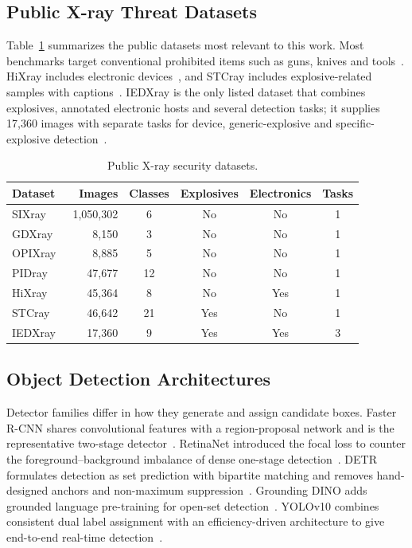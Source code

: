 \subsection{Public X-ray Threat Datasets}
Table~\ref{tab:datasets} summarizes the public datasets most relevant to this
work. Most benchmarks target conventional prohibited items such as guns, knives
and tools~\citep{miao2019sixray,mery2015gdxray,wei2020opixray,wang2021pidray}.
HiXray includes electronic devices~\citep{tao2021hixray}, and STCray includes
explosive-related samples with captions~\citep{velayudhan2025stingbee}. IEDXray is
the only listed dataset that combines explosives, annotated electronic hosts and
several detection tasks; it supplies 17,360 images with separate tasks for device,
generic-explosive and specific-explosive detection~\citep{takele2026iedxray}.

\begin{table}[htbp]
\centering\tablesetup
\caption{Public X-ray security datasets.}
\label{tab:datasets}
\begin{tabular}{@{}lrcccc@{}}
\toprule
Dataset & Images & Classes & Explosives & Electronics & Tasks\\
\midrule
SIXray~\citep{miao2019sixray} & 1,050,302 & 6 & No & No & 1\\
GDXray~\citep{mery2015gdxray} & 8,150 & 3 & No & No & 1\\
OPIXray~\citep{wei2020opixray} & 8,885 & 5 & No & No & 1\\
PIDray~\citep{wang2021pidray} & 47,677 & 12 & No & No & 1\\
HiXray~\citep{tao2021hixray} & 45,364 & 8 & No & Yes & 1\\
STCray~\citep{velayudhan2025stingbee} & 46,642 & 21 & Yes & No & 1\\
IEDXray~\citep{takele2026iedxray} & 17,360 & 9 & Yes & Yes & 3\\
\bottomrule
\end{tabular}
\end{table}

\subsection{Object Detection Architectures}
Detector families differ in how they generate and assign candidate boxes. Faster
R-CNN shares convolutional features with a region-proposal network and is the
representative two-stage detector~\citep{ren2015faster}. RetinaNet introduced the
focal loss to counter the foreground--background imbalance of dense one-stage
detection~\citep{lin2017focal}. DETR formulates detection as set prediction with
bipartite matching and removes hand-designed anchors and non-maximum
suppression~\citep{carion2020detr}. Grounding DINO adds grounded language
pre-training for open-set detection~\citep{liu2023grounding}. YOLOv10 combines
consistent dual label assignment with an efficiency-driven architecture to give
end-to-end real-time detection~\citep{wang2024yolov10}.


